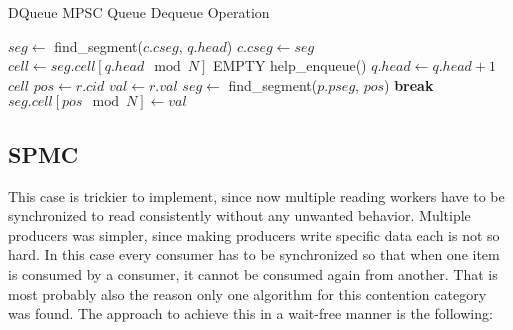 \begin{algorithm}[!ht]
    \centering
    \captionsetup{justification=centering}
    \caption{DQueue \ac{MPSC} Queue Dequeue Operation \cite{WangCacheCoherent}}
    \label{alg:dqueue-dequeue}
    \scriptsize
    \begin{algorithmic}[1]
            \State $seg \gets$ find\_segment($c.cseg$, $q.head$)
                \State $c.cseg \gets seg$ 
            \EndIf
            \State $cell \gets seg.cell[q.head \mod N]$
             
                    \State \Return EMPTY
                \Else
                    \State help\_enqueue() 
                \EndIf
            \EndIf
            \State $q.head \gets q.head + 1$ 
            \State \Return $cell$
        \EndFunction
        \State
                    \State $pos \gets r.cid$
                    \State $val \gets r.val$
                    \State $seg \gets$ find\_segment($p.pseg$, $pos$)
                        \State \textbf{break} 
                    \EndIf
                        \State $seg.cell[pos \mod N] \gets val$ 
                    \EndIf
                \EndFor
            \EndFor
        \EndFunction
    \end{algorithmic}
\end{algorithm}

\subsection{\acf{SPMC}}\label{subsec:single-producer-and-multiple-consumer}
This case is trickier to implement, since now multiple reading workers have to be synchronized to read consistently without any unwanted behavior. Multiple producers was simpler, since making producers write specific data each is not so hard. In this case every consumer has to be synchronized so that when one item is consumed by a consumer, it cannot be consumed again from another. That is most probably also the reason only one algorithm for this contention category was found. The approach to achieve this in a wait-free manner is the following:

